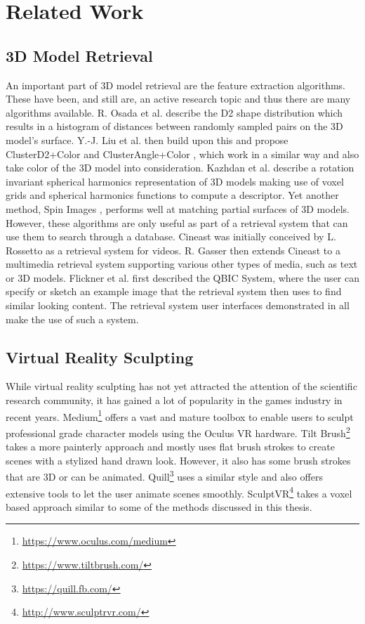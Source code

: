 \chapter{Related Work}

\section{3D Model Retrieval}

An important part of 3D model retrieval are the feature extraction algorithms. These have been, and still are, an active research topic and thus there are many algorithms available. R. Osada et al. describe the D2 shape distribution \cite{d2_shape_distribution} which results in a histogram of distances between randomly sampled pairs on the 3D model's surface. Y.-J. Liu et al. then build upon this and propose ClusterD2+Color and ClusterAngle+Color \cite{cluster_d2_color}, which work in a similar way and also take color of the 3D model into consideration. Kazhdan et al. describe a rotation invariant spherical harmonics representation of 3D models \cite{spherical_harmonics} making use of voxel grids and spherical harmonics functions to compute a descriptor. Yet another method, Spin Images \cite{spin_descriptor}, performs well at matching partial surfaces of 3D models.\\
However, these algorithms are only useful as part of a retrieval system that can use them to search through a database. Cineast was initially conceived by L. Rossetto \cite{cineast_rossetto} as a retrieval system for videos. R. Gasser then extends Cineast to a multimedia retrieval system \cite{cineast_gasser} supporting various other types of media, such as text or 3D models. Flickner et al. \cite{qbic_system} first described the QBIC System, where the user can specify or sketch an example image that the retrieval system then uses to find similar looking content. The retrieval system user interfaces demonstrated in \cite{cineast_gasser, 3d_model_retrieval_vranic, cluster_d2_color} all make the use of such a system.

\section{Virtual Reality Sculpting}

While virtual reality sculpting has not yet attracted the attention of the scientific research community, it has gained a lot of popularity in the games industry in recent years.
Medium\footnote{\url{https://www.oculus.com/medium}} offers a vast and mature toolbox to enable users to sculpt professional grade character models using the Oculus VR hardware.
Tilt Brush\footnote{\url{https://www.tiltbrush.com/}} takes a more painterly approach and mostly uses flat brush strokes to create scenes with a stylized hand drawn look. However, it also has some brush strokes that are 3D or can be animated. Quill\footnote{\url{https://quill.fb.com/}} uses a similar style and also offers extensive tools to let the user animate scenes smoothly. SculptVR\footnote{\url{http://www.sculptrvr.com/}} takes a voxel based approach similar to some of the methods discussed in this thesis.
